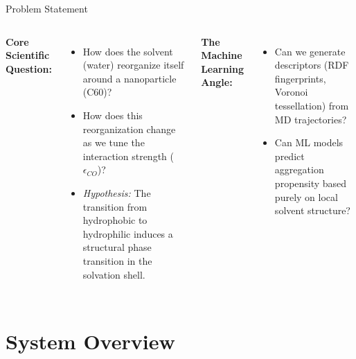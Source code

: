 \documentclass[aspectratio=169, 10pt]{beamer}
\begin{document}
\begin{frame}{Problem Statement}
    \begin{columns}
        \textbf{Core Scientific Question:}
        \begin{itemize}
            \item How does the solvent (water) reorganize itself around a nanoparticle (C60)?
            \item How does this reorganization change as we tune the interaction strength ($\epsilon_{CO}$)?
            \item \textit{Hypothesis:} The transition from hydrophobic to hydrophilic induces a structural phase transition in the solvation shell.
        \end{itemize}
        
        \vspace{0.5cm}
        \textbf{The Machine Learning Angle:}
        \begin{itemize}
            \item Can we generate descriptors (RDF fingerprints, Voronoi tessellation) from MD trajectories?
            \item Can ML models predict aggregation propensity based purely on local solvent structure?
        \end{itemize}

        \centering
    \end{columns}
\end{frame}

\section{System Overview}
\end{document}

